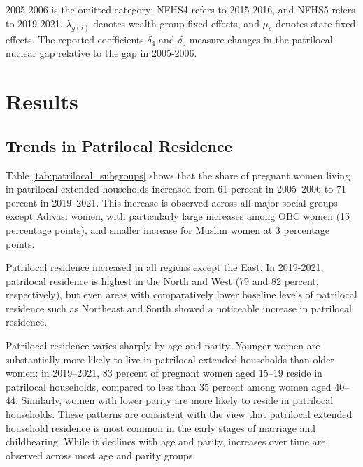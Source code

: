 \documentclass[12pt]{article}
\begin{document}
2005-2006 is the omitted category; NFHS4 refers to 2015-2016, and NFHS5 refers to 2019-2021. $\lambda_{g(i)}$ denotes wealth-group fixed effects, and $\mu_s$ denotes state fixed effects. The reported coefficients $\delta_4$ and $\delta_5$ measure changes in the patrilocal-nuclear gap relative to the gap in 2005-2006.

\section{Results}
\subsection{Trends in Patrilocal Residence}

Table \ref{tab:patrilocal_subgroups} shows that the share of pregnant women living in patrilocal extended households increased from 61 percent in 2005–2006 to 71 percent in 2019–2021. This increase is observed across all major social groups except Adivasi women, with particularly large increases among OBC women (15 percentage points), and smaller increase for Muslim women at 3 percentage points.

Patrilocal residence increased in all regions except the East. In 2019-2021, patrilocal residence is highest in the North and West (79 and 82 percent, respectively), but even areas with comparatively lower baseline levels of patrilocal residence such as Northeast and South showed a noticeable increase in patrilocal residence.  

Patrilocal residence varies sharply by age and parity. Younger women are substantially more likely to live in patrilocal extended households than older women: in 2019–2021, 83 percent of pregnant women aged 15–19 reside in patrilocal households, compared to less than 35 percent among women aged 40–44. Similarly, women with lower parity are more likely to reside in patrilocal households. These patterns are consistent with the view that patrilocal extended household residence is most common in the early stages of marriage and childbearing. While it declines with age and parity, increases over time are observed across most age and parity groups. 
\end{document}
